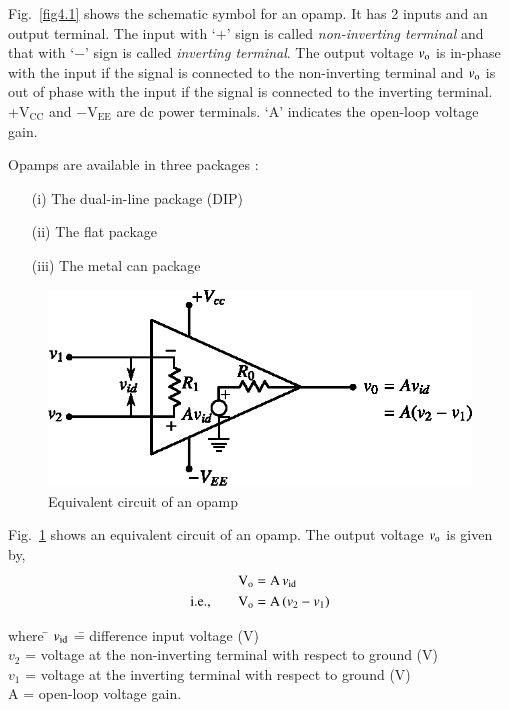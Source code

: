Fig.~\ref{fig4.1} shows the schematic symbol for an opamp. It has 2 inputs and an output terminal. The input with `+' sign is called {\em non-inverting terminal} and that with `$-$' sign is called {\em inverting terminal}. The output voltage $v_{\textrm{o}}$ is in-phase with the input if the signal is connected to the non-inverting terminal and $v_{\textrm{o}}$ is out of phase with the input if the signal is connected to the inverting terminal. +V$_{\text{CC}}$ and $-$V$_{\text{EE}}$ are dc power terminals. `A' indicates the open-loop voltage gain.

\smallskip
Opamps are available in three packages :
\begin{itemize}
\item[(i)] The dual-in-line package (DIP)

\item[(ii)] The flat package

\item[(iii)] The metal can package
\end{itemize}

\begin{figure}[H]
\centering
\includegraphics{chap4/fig4.2.eps}
\caption{Equivalent circuit of an opamp}\label{fig4.2}
\end{figure}

Fig.~\ref{fig4.2} shows an equivalent circuit of an opamp. The output voltage $v_{\textrm{o}}$ is given by,
\begin{align}
\textrm{V}_{\textrm{o}} &= \textrm{A} \, v_{\operatorname{id}}\notag\\
\text{i.e.,}\qquad \textrm{V}_{\textrm{o}} &= \textrm{A}\, (v_{2}-v_{1})\label{eq4.1}
\end{align}
\begin{tabbing}
where \= $v_{\operatorname{id}}$ \== difference input voltage (V)\\[3pt]
      \> $v_{2}$  \>= voltage at the non-inverting terminal with respect to ground (V)\\[3pt]
      \> $v_{1}$  \>= voltage at the inverting terminal with respect to ground (V)\\[3pt]
      \> A       \>= open-loop voltage gain.
\end{tabbing}

